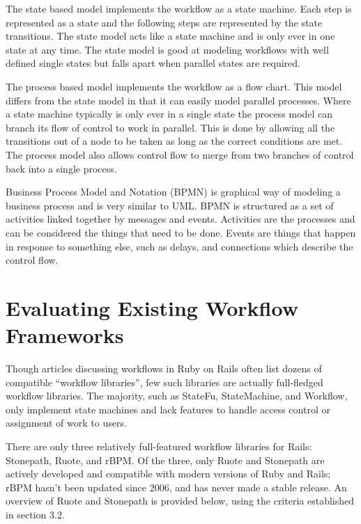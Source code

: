 The state based model implements the workflow as a state machine. Each step is represented as a state and the following steps are represented by the state transitions. The state model acts like a state machine and is only ever in one state at any time. The state model is good at modeling workflows with well defined single states but falls apart when parallel states are required.

The process based model implements the workflow as a flow chart. This model differs from the state model in that it can easily model parallel processes. Where a state machine typically is only ever in a single state the process model can branch its flow of control to work in parallel. This is done by allowing all the transitions out of a node to be taken as long as the correct conditions are met. The process model also allows control flow to merge from two branches of control back into a single process.

Business Process Model and Notation (BPMN) is graphical way of modeling a business process and is very similar to UML. BPMN is structured as a set of activities linked together by messages and events. Activities are the processes and can be considered the things that need to be done. Events are things that happen in response to something else, such as delays, and connections which describe the control flow.


\section {Evaluating Existing Workflow Frameworks}
\label {sec:evaluating-existing-workflow-frameworks}

Though articles discussing workflows in Ruby on Rails often list dozens of compatible ``workflow libraries'', few such libraries are actually full-fledged workflow libraries. The majority, such as StateFu, StateMachine, and Workflow, only implement state machines and lack features to handle access control or assignment of work to users.

There are only three relatively full-featured workflow libraries for Rails: Stonepath, Ruote, and rBPM. Of the three, only Ruote and Stonepath are actively developed and compatible with modern versions of Ruby and Rails; rBPM hasn’t been updated since 2006, and has never made a stable release. An overview of Ruote and Stonepath is provided below, using the criteria established in section 3.2.



